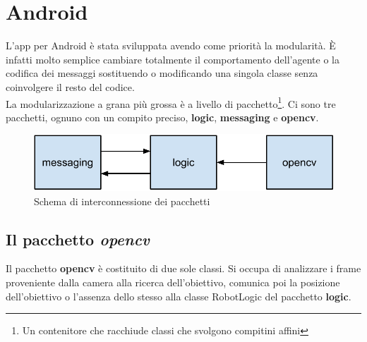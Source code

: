 \section {Android}
L'app per Android è stata sviluppata avendo come priorità la modularità. È 
infatti molto semplice cambiare totalmente il comportamento dell'agente o la 
codifica dei messaggi sostituendo o modificando una singola classe senza 
coinvolgere il resto del codice.\\
La modularizzazione a grana più grossa è a livello di pacchetto\footnote{Un contenitore 
che racchiude classi che svolgono compitini affini}. Ci sono tre pacchetti,
ognuno con un compito preciso, \textbf{logic}, \textbf{messaging} e \textbf{opencv}.
\begin{figure}[H] \center
\includegraphics[width=\textwidth]{immagini/interconnessione_pacchetti.pdf}
\caption{Schema di interconnessione dei pacchetti} 
\end{figure}

\subsection {Il pacchetto \textit{opencv}}
Il pacchetto \textbf{opencv} è costituito di due sole classi. Si occupa di analizzare 
i frame proveniente dalla camera alla ricerca dell'obiettivo, comunica poi la posizione 
dell'obiettivo o l'assenza dello stesso alla classe RobotLogic del pacchetto 
\textbf{logic}.
